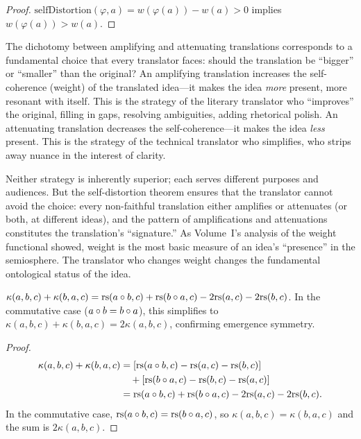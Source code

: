 \begin{proof}
$\mathrm{selfDistortion}(\varphi, a) = w(\varphi(a)) - w(a) > 0$ implies $w(\varphi(a)) > w(a)$.
\end{proof}

\begin{interpretation}
\label{interp:amplification-attenuation}
The dichotomy between amplifying and attenuating translations corresponds to a fundamental choice that every translator faces: should the translation be ``bigger'' or ``smaller'' than the original?  An amplifying translation increases the self-coherence (weight) of the translated idea---it makes the idea \emph{more} present, more resonant with itself.  This is the strategy of the literary translator who ``improves'' the original, filling in gaps, resolving ambiguities, adding rhetorical polish.  An attenuating translation decreases the self-coherence---it makes the idea \emph{less} present.  This is the strategy of the technical translator who simplifies, who strips away nuance in the interest of clarity.

Neither strategy is inherently superior; each serves different purposes and audiences.  But the self-distortion theorem ensures that the translator cannot avoid the choice: every non-faithful translation either amplifies or attenuates (or both, at different ideas), and the pattern of amplifications and attenuations constitutes the translation's ``signature.''  As Volume~I's analysis of the weight functional showed, weight is the most basic measure of an idea's ``presence'' in the semiosphere.  The translator who changes weight changes the fundamental ontological status of the idea.
\end{interpretation}

\begin{theorem}
\label{thm:emergence-antisymmetry}
$\kappa(a, b, c) + \kappa(b, a, c) = \mathrm{rs}(a \circ b, c) + \mathrm{rs}(b \circ a, c) - 2\mathrm{rs}(a, c) - 2\mathrm{rs}(b, c)$.
In the commutative case ($a \circ b = b \circ a$), this simplifies to $\kappa(a, b, c) + \kappa(b, a, c) = 2\kappa(a, b, c)$, confirming emergence symmetry.
\end{theorem}

\begin{proof}
\begin{align*}
  \kappa(a, b, c) + \kappa(b, a, c) &= [\mathrm{rs}(a \circ b, c) - \mathrm{rs}(a, c) - \mathrm{rs}(b, c)] \\
  &\quad + [\mathrm{rs}(b \circ a, c) - \mathrm{rs}(b, c) - \mathrm{rs}(a, c)] \\
  &= \mathrm{rs}(a \circ b, c) + \mathrm{rs}(b \circ a, c) - 2\mathrm{rs}(a, c) - 2\mathrm{rs}(b, c).
\end{align*}
In the commutative case, $\mathrm{rs}(a \circ b, c) = \mathrm{rs}(b \circ a, c)$, so $\kappa(a, b, c) = \kappa(b, a, c)$ and the sum is $2\kappa(a, b, c)$.
\end{proof}

